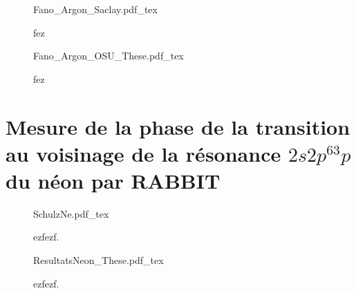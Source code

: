 
\begin{figure}
\centering
\def\svgwidth{1\textwidth}
{Fano_Argon_Saclay.pdf_tex}
\caption{fez}
\label{fig:Phases_Argon_Saclay}
\end{figure}

\begin{figure}
\centering
\def\svgwidth{1\textwidth}
{Fano_Argon_OSU_These.pdf_tex}
\caption{fez}
\label{fig:Phases_Argon_OSU}
\end{figure}





\chapter[Mesure de la phase de la transition au voisinage de la résonance $2s2p^63p$ du néon par RABBIT]{Mesure de la phase de la transition au voisinage de la résonance \MakeLowercase{$2s2p^63p$} du néon par RABBIT}

\begin{figure}
\centering
\def\svgwidth{0.6\textwidth}
{SchulzNe.pdf_tex}
\caption{ezfezf.}
\label{fig:SchulzNe}
\end{figure}

\begin{figure}
\centering
\def\svgwidth{\textwidth}
{ResultatsNeon_These.pdf_tex}
\caption{ezfezf.}
\label{fig:ResultatsNe}
\end{figure}






